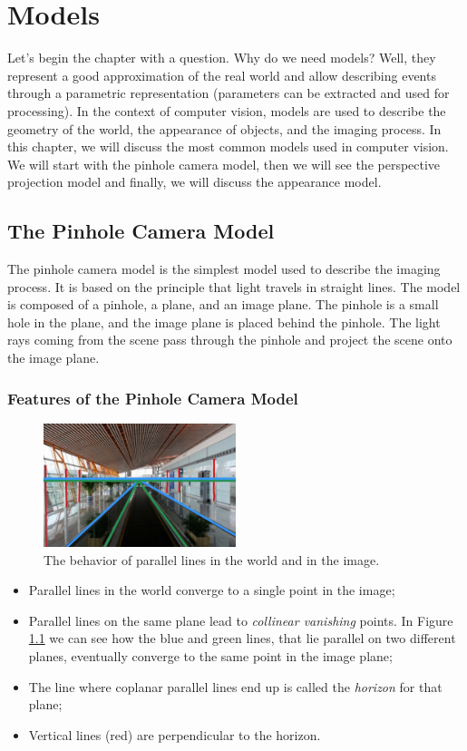 \chapter{Models}
Let's begin the chapter with a question. Why do we need models?
Well, they represent a good approximation of the real world and allow describing events through a parametric representation (parameters can be extracted and used for processing). In the context of computer vision, models are used to describe the geometry of the world, the appearance of objects, and the imaging process. In this chapter, we will discuss the most common models used in computer vision. We will start with the pinhole camera model, then we will see the perspective projection model and finally, we will discuss the appearance model.
\section{The Pinhole Camera Model}
The pinhole camera model is the simplest model used to describe the imaging process. It is based on the principle that light travels in straight lines. The model is composed of a pinhole, a plane, and an image plane. The pinhole is a small hole in the plane, and the image plane is placed behind the pinhole. The light rays coming from the scene pass through the pinhole and project the scene onto the image plane. 
\subsection{Features of the Pinhole Camera Model}
\begin{figure}[H]
    \centering
    \includegraphics[width=0.5\textwidth]{Figures/horizon.jpg}
    \caption{The behavior of parallel lines in the world and in the image.}
    \label{fig:horizon}
\end{figure}
\begin{itemize}
    \item Parallel lines in the world converge to a single point in the image;
    \item Parallel lines on the same plane lead to \textit{collinear vanishing} points. In Figure \ref{fig:horizon} we can see how the blue and green lines, that lie parallel on two different planes, eventually converge to the same point in the image plane;
    \item The line where coplanar parallel lines end up is called the \textit{horizon} for that plane;
    \item Vertical lines (red) are perpendicular to the horizon.
\end{itemize}

